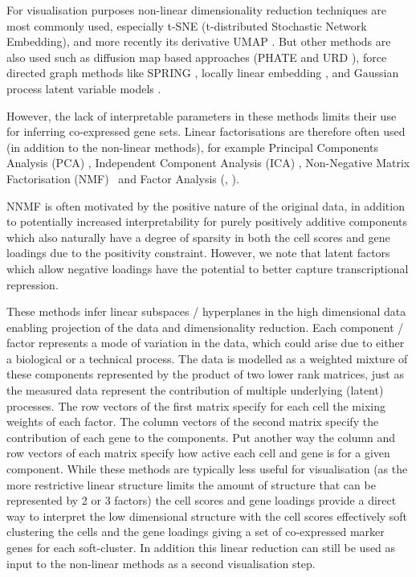 For visualisation purposes non-linear dimensionality reduction techniques are most commonly used, especially t-SNE (t-distributed Stochastic Network Embedding), and more recently its derivative UMAP \parencite{McInnes2018UMAP,Becht2019Dimensionality}.
But other methods are also used such as diffusion map based approaches (PHATE and URD \cite{Haghverdi2015Diffusion, Moon2019Visualizing, Farrell2018Singlecell}), force directed graph methods like SPRING \parencite{Weinreb2018SPRING, Wagner2018Singlecell}, locally linear embedding \parencite{Welch2016SLICER}, and Gaussian process latent variable models \parencite{Campbell2015Bayesian}.

However, the lack of interpretable parameters in these methods limits their use for inferring co-expressed gene sets.
Linear factorisations are therefore often used (in addition to the non-linear methods), for example Principal Components Analysis (PCA) \parencite{Alter2000Singular, Green2018Comprehensive},  Independent Component Analysis (ICA) \parencite{Saunders2018Molecular}, Non-Negative Matrix Factorisation (NMF)~\cite{Brunet2004Metagenes, Kim2003Subsystem, Shao2017Robust, Zhu2017Detecting, Duren2018Integrative, Kotliar2018Identifying, Welch2019SingleCell} and Factor Analysis (\cite{Bernardo2003Bayesian, Buettner2015Computational}, \cite[reviewed in][]{Stein-OBrien2018Enter}).


NNMF is often motivated by the positive nature of the original data, in addition to potentially increased interpretability for purely positively additive components which also naturally have a degree of sparsity in both the cell scores and gene loadings due to the positivity constraint.
However, we note that latent factors which allow negative loadings have the potential to better capture transcriptional repression. 

These methods infer linear subspaces / hyperplanes in the high dimensional data enabling projection of the data and dimensionality reduction.
Each component / factor represents a mode of variation in the data, which could arise due to either a biological or a technical process.
The data is modelled as a weighted mixture of these components represented by the product of two lower rank matrices, just as the measured data represent the contribution of multiple underlying (latent) processes.
The row vectors of the first matrix specify for each cell the mixing weights of each factor.
The column vectors of the second matrix specify the contribution of each gene to the components.
Put another way the column and row vectors of each matrix specify how active each cell and gene is for a given component.
While these methods are typically less useful for visualisation (as the more restrictive linear structure limits the amount of structure that can be represented by 2 or 3 factors) the cell scores and gene loadings provide a direct way to interpret the low dimensional structure with the cell scores effectively soft clustering the cells and the gene loadings giving a set of co-expressed marker genes for each soft-cluster.
In addition this linear reduction can still be used as input to the non-linear methods as a second visualisation step.

